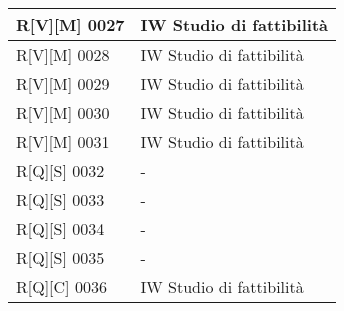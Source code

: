 \begin{center}
\begin{longtable}{|p{3cm}|p{3cm}|}
    R[V][M] 0027    & IW Studio di fattibilità  \\
    \hline
    R[V][M] 0028    & IW Studio di fattibilità  \\
    \hline
    R[V][M] 0029    & IW Studio di fattibilità  \\
    \hline
    R[V][M] 0030    & IW Studio di fattibilità  \\
    \hline
    R[V][M] 0031    & IW Studio di fattibilità  \\
    \hline
    R[Q][S] 0032    & -  \\
    \hline
    R[Q][S] 0033    & -  \\
    \hline
    R[Q][S] 0034    & -  \\
    \hline
    R[Q][S] 0035    & -  \\
    \hline
    R[Q][C] 0036    & IW Studio di fattibilità  \\
    \hline
    \end{longtable}
    \end{center}%

